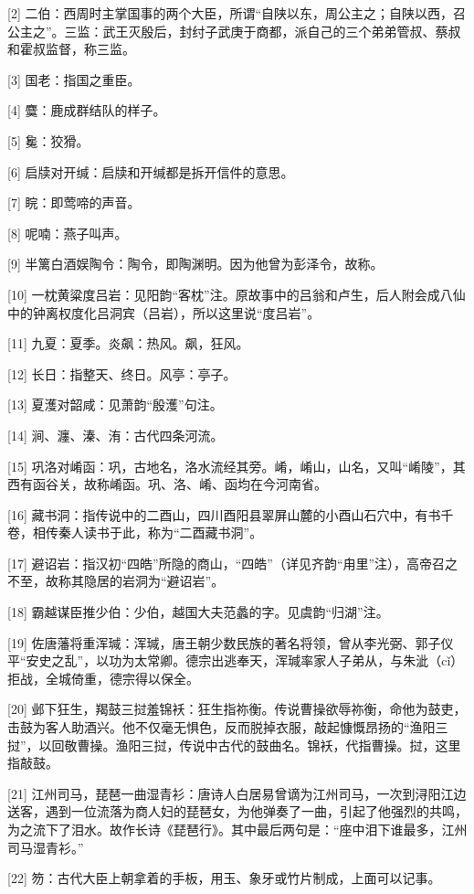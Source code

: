\documentclass[12pt,UTF8]{ctexbook}
\begin{document}
[2] 二伯：西周时主掌国事的两个大臣，所谓“自陕以东，周公主之；自陕以西，召公主之”。三监：武王灭殷后，封纣子武庚于商都，派自己的三个弟弟管叔、蔡叔和霍叔监督，称三监。

[3] 国老：指国之重臣。

[4] 麌：鹿成群结队的样子。

[5] 毚：狡猾。

[6] 启牍对开缄：启牍和开缄都是拆开信件的意思。

[7] 睆：即莺啼的声音。

[8] 呢喃：燕子叫声。

[9] 半篱白酒娱陶令：陶令，即陶渊明。因为他曾为彭泽令，故称。

[10] 一枕黄粱度吕岩：见阳韵“客枕”注。原故事中的吕翁和卢生，后人附会成八仙中的钟离权度化吕洞宾（吕岩），所以这里说“度吕岩”。

[11] 九夏：夏季。炎飙：热风。飙，狂风。

[12] 长日：指整天、终日。风亭：亭子。

[13] 夏濩对韶咸：见萧韵“殷濩”句注。

[14] 涧、瀍、溱、洧：古代四条河流。

[15] 巩洛对崤函：巩，古地名，洛水流经其旁。崤，崤山，山名，又叫“崤陵”，其西有函谷关，故称崤函。巩、洛、崤、函均在今河南省。

[16] 藏书洞：指传说中的二酉山，四川酉阳县翠屏山麓的小酉山石穴中，有书千卷，相传秦人读书于此，称为“二酉藏书洞”。

[17] 避诏岩：指汉初“四皓”所隐的商山，“四皓”（详见齐韵“甪里”注），高帝召之不至，故称其隐居的岩洞为“避诏岩”。

[18] 霸越谋臣推少伯：少伯，越国大夫范蠡的字。见虞韵“归湖”注。

[19] 佐唐藩将重浑瑊：浑瑊，唐王朝少数民族的著名将领，曾从李光弼、郭子仪平“安史之乱”，以功为太常卿。德宗出逃奉天，浑瑊率家人子弟从，与朱泚（cǐ）拒战，全城倚重，德宗得以保全。

[20] 邺下狂生，羯鼓三挝羞锦袄：狂生指祢衡。传说曹操欲辱祢衡，命他为鼓吏，击鼓为客人助酒兴。他不仅毫无惧色，反而脱掉衣服，敲起慷慨昂扬的“渔阳三挝”，以回敬曹操。渔阳三挝，传说中古代的鼓曲名。锦袄，代指曹操。挝，这里指敲鼓。

[21] 江州司马，琵琶一曲湿青衫：唐诗人白居易曾谪为江州司马，一次到浔阳江边送客，遇到一位流落为商人妇的琵琶女，为他弹奏了一曲，引起了他强烈的共鸣，为之流下了泪水。故作长诗《琵琶行》。其中最后两句是：“座中泪下谁最多，江州司马湿青衫。”

[22] 笏：古代大臣上朝拿着的手板，用玉、象牙或竹片制成，上面可以记事。
\end{document}
